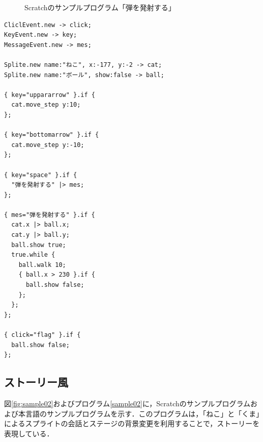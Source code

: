 \documentclass[10pt,a4j]{ltjsarticle}
\begin{document}
\begin{figure}[H]
\begin{minipage}[b]{0.5\linewidth}
  \end{minipage}
  \caption{Scratchのサンプルプログラム「弾を発射する」}
  \label{fig:sample03}
\end{figure}

\begin{lstlisting}[caption=本言語のサンプルプログラム「弾を発射する」, label=sample03]
CliclEvent.new -> click;
KeyEvent.new -> key;
MessageEvent.new -> mes;

Splite.new name:"ねこ", x:-177, y:-2 -> cat;
Splite.new name:"ボール", show:false -> ball;

{ key="uppararrow" }.if {
  cat.move_step y:10;
};

{ key="bottomarrow" }.if {
  cat.move_step y:-10;
};

{ key="space" }.if {
  "弾を発射する" |> mes;
};

{ mes="弾を発射する" }.if {
  cat.x |> ball.x;
  cat.y |> ball.y;
  ball.show true;
  true.while {
    ball.walk 10;
    { ball.x > 230 }.if {
      ball.show false;
    };
  };
};

{ click="flag" }.if {
  ball.show false;
};

\end{lstlisting}

\subsection{ストーリー風}
図\ref{fig:sample02}およびプログラム\ref{sample02}に，Scratchのサンプルプログラムおよび本言語のサンプルプログラムを示す．このプログラムは，「ねこ」と「くま」によるスプライトの会話とステージの背景変更を利用することで，ストーリーを表現している．
\end{document}
